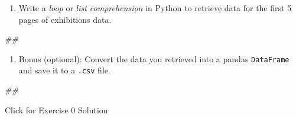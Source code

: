 \documentclass[
]{book}
\newenvironment{Shaded}{\begin{snugshade}}{\end{snugshade}}
\newcommand{\CommentTok}[1]{\textcolor[rgb]{0.56,0.35,0.01}{\textit{#1}}}
\providecommand{\tightlist}{%
  \setlength{\itemsep}{0pt}\setlength{\parskip}{0pt}}
\begin{document}
\begin{enumerate}
\def\labelenumi{\arabic{enumi}.}
\setcounter{enumi}{2}
\tightlist
\item
  Write a \emph{loop} or \emph{list comprehension} in Python to retrieve data
  for the first 5 pages of exhibitions data.
\end{enumerate}

\begin{Shaded}
\begin{Highlighting}[]
\CommentTok{\#\#}
\end{Highlighting}
\end{Shaded}

\begin{enumerate}
\def\labelenumi{\arabic{enumi}.}
\setcounter{enumi}{3}
\tightlist
\item
  Bonus (optional): Convert the data you retrieved into a pandas
  \texttt{DataFrame} and save it to a \texttt{.csv} file.
\end{enumerate}

\begin{Shaded}
\begin{Highlighting}[]
\CommentTok{\#\#}
\end{Highlighting}
\end{Shaded}

{Click for Exercise 0 Solution}
\end{document}
